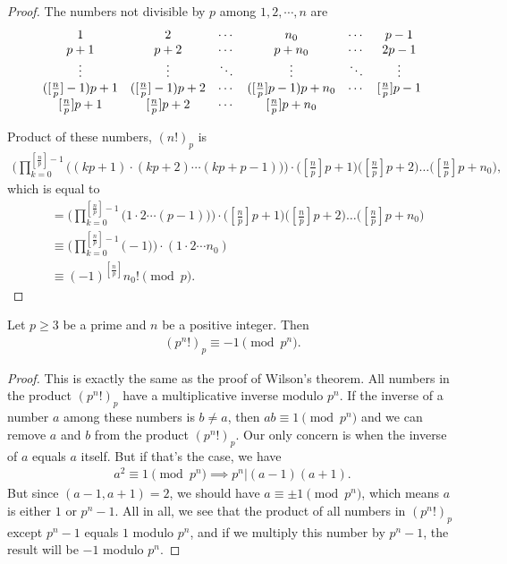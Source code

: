 \documentclass{subfile}
\begin{document}
	\begin{proof}
		The numbers not divisible by $p$ among $1, 2, \cdots, n$ are
			\[\begin{array}{*{20}{c}}
				1&2& \cdots &{{n_0}}& \cdots &{p - 1}\\
				{p + 1}&{p + 2}& \cdots &{p + {n_0}}& \cdots &{2p - 1}\\
				\vdots & \vdots & \ddots & \vdots & \ddots & \vdots \\
				{( {[{\textstyle{n \over p}}] - 1} )p + 1}&{( {[{\textstyle{n \over p}}] - 1} )p + 2}& \cdots &{( {[{\textstyle{n \over p}}]p - 1} )p + {n_0}}& \cdots &{[{\textstyle{n \over p}}]p - 1}\\
				{[{\textstyle{n \over p}}]p + 1}&{[{\textstyle{n \over p}}]p + 2}& \cdots &{[{\textstyle{n \over p}}]p + {n_0}}&{}&{}
			\end{array}\]

	Product of these numbers, $(n!)_p$ is
		\begin{align*}
			\Bigg(\prod_{k=0}^{[\frac np]-1}\!\!\bigl((kp+1)\cdot(kp+2)\cdots(kp+p-1)\bigr)\Bigg)  \cdot
			\bigl([\tfrac np]p+1\bigl)\bigl([\tfrac np]p+2\bigl)\dots\bigl([\tfrac np]p+n_0\bigl),
		\end{align*}
	which is equal to
		\begin{align*}
			&=\Bigg(\prod_{k=0}^{[\frac np]-1}\!\!\bigl(1\cdot2\cdots(p-1)\bigr)\Bigg)  \cdot
			\bigl([\tfrac np]p+1\bigl)\bigl([\tfrac np]p+2\bigl)\dots\bigl([\tfrac np]p+n_0\bigl)\\
			&\equiv \Bigg(\prod_{k=0}^{[\frac np]-1}\!\!\bigl(-1\bigr) \Bigg) \cdot \left(
			1 \cdot 2 \cdots n_0\right)\\
			&\equiv
			(-1)^{[\frac np]} n_0!\pmod p.
		\end{align*}
	\end{proof}


	\begin{proposition}
		Let $p\geq 3$ be a prime and $n$ be a positive integer. Then
			\begin{align*}
				(p^n!)_p \equiv -1 \pmod{p^n}.
			\end{align*}
	\end{proposition}

	\begin{proof}
		This is exactly the same as the proof of Wilson's theorem. All numbers in the product $(p^n!)_p$ have a multiplicative inverse modulo $p^n$. If the inverse of a number $a$ among these numbers is $b \neq a$, then $a b \equiv 1 \pmod{p^n}$ and we can remove $a$ and $b$ from the product $(p^n!)_p$. Our only concern is when the inverse of $a$ equals $a$ itself. But if that's the case, we have
			\begin{align*}
				a^2 \equiv 1 \pmod{p^n} \implies p^n| (a-1)(a+1).
			\end{align*}
		But since $(a-1,a+1)=2$, we should have $a \equiv \pm 1 \pmod{p^n}$, which means $a$ is either $1$ or $p^n-1$. All in all, we see that the product of all numbers in $(p^n!)_p$ except $p^n-1$ equals $1$ modulo $p^n$, and if we multiply this number by $p^n-1$, the result will be $-1$ modulo $p^n$.
	\end{proof}
\end{document}
